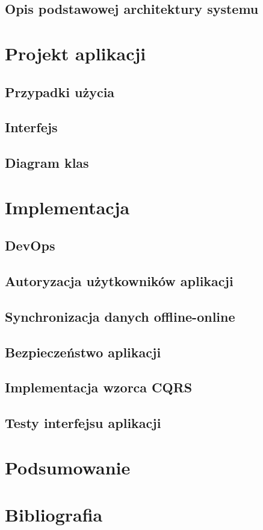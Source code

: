 \section{Opis podstawowej architektury systemu}
\chapter{Projekt aplikacji}
\section{Przypadki użycia}
\section{Interfejs}
\section{Diagram klas}
\chapter{Implementacja}
\section{DevOps}
\section{Autoryzacja użytkowników aplikacji}
\section{Synchronizacja danych offline-online}
\section{Bezpieczeństwo aplikacji}
\section{Implementacja wzorca CQRS}
\section{Testy interfejsu aplikacji}
\chapter{Podsumowanie}
\chapter*{Bibliografia}
